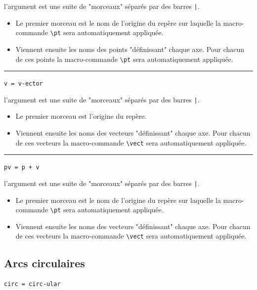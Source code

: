 \documentclass[12pt,a4paper]{book}
\newcommand\env[1]{\texttt{#1}}
\newcommand\macro[1]{\env{\textbackslash{}#1}}
\theoremstyle{definition}
\newcommand\separation{
	\medskip
	\hfill\rule{0.5\textwidth}{0.75pt}\hfill
	\medskip
}
\newcommand\mwhyprefix[2]{%
	\texttt{#1 = #1-#2}%
}
\newcommand\prefix[1]{%
	\texttt{#1}%
}
\begin{document}
{{\IDarg{} l'argument est une suite de "morceaux" séparés par des barres \verb+|+.

\begin{itemize}[topsep=0pt]
	\item Le premier morceau est le nom de l'origine du repère sur laquelle la macro-commande \macro{pt} sera automatiquement appliquée.

	\item Viennent ensuite les noms des points "définissant" chaque axe. Pour chacun de ces points la macro-commande \macro{pt} sera automatiquement appliquée.
\end{itemize}


\separation

 \hfill \mwhyprefix{v}{ector}

\IDarg{} l'argument est une suite de "morceaux" séparés par des barres \verb+|+.

\begin{itemize}[topsep=0pt]
	\item Le premier morceau est l'origine du repère.

	\item Viennent ensuite les noms des vecteurs "définissant" chaque axe. Pour chacun de ces vecteurs la macro-commande \macro{vect} sera automatiquement appliquée.
\end{itemize}


\separation

 \hfill \prefix{pv = p + v}

\IDarg{} l'argument est une suite de "morceaux" séparés par des barres \verb+|+.

\begin{itemize}[topsep=0pt]
	\item Le premier morceau est le nom de l'origine du repère sur laquelle la macro-commande \macro{pt} sera automatiquement appliquée.

	\item Viennent ensuite les noms des vecteurs "définissant" chaque axe. Pour chacun de ces vecteurs la macro-commande \macro{vect} sera automatiquement appliquée.
\end{itemize}


\subsection{Arcs circulaires}



 \hfill \mwhyprefix{circ}{ular}

}}
\end{document}
